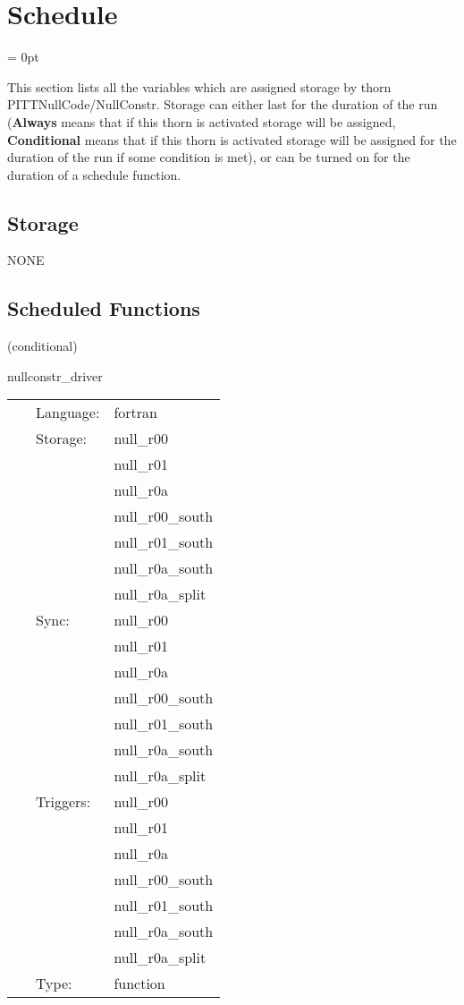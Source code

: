 
\section{Schedule} 


\parskip = 0pt


\noindent This section lists all the variables which are assigned storage by thorn PITTNullCode/NullConstr.  Storage can either last for the duration of the run ({\bf Always} means that if this thorn is activated storage will be assigned, {\bf Conditional} means that if this thorn is activated storage will be assigned for the duration of the run if some condition is met), or can be turned on for the duration of a schedule function.


\subsection*{Storage}NONE
\subsection*{Scheduled Functions}
\vspace{5mm}

   (conditional) 

\hspace{5mm} nullconstr\_driver 

\hspace{5mm}{\it calculate constraint components r00, r01, r0a } 


\hspace{5mm}

 \begin{tabular*}{160mm}{cll} 
~ & Language:  & fortran \\ 
~ & Storage:  & null\_r00 \\ 
~& ~ &null\_r01\\ 
~& ~ &null\_r0a\\ 
~& ~ &null\_r00\_south\\ 
~& ~ &null\_r01\_south\\ 
~& ~ &null\_r0a\_south\\ 
~& ~ &null\_r0a\_split\\ 
~ & Sync:  & null\_r00 \\ 
~& ~ &null\_r01\\ 
~& ~ &null\_r0a\\ 
~& ~ &null\_r00\_south\\ 
~& ~ &null\_r01\_south\\ 
~& ~ &null\_r0a\_south\\ 
~& ~ &null\_r0a\_split\\ 
~ & Triggers:  & null\_r00 \\ 
~& ~ &null\_r01\\ 
~& ~ &null\_r0a\\ 
~& ~ &null\_r00\_south\\ 
~& ~ &null\_r01\_south\\ 
~& ~ &null\_r0a\_south\\ 
~& ~ &null\_r0a\_split\\ 
~ & Type:  & function \\ 
\end{tabular*} 


